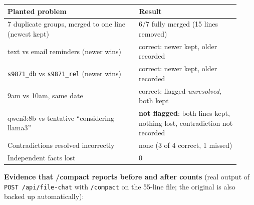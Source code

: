 \documentclass[11pt]{article}
\begin{document}
\endgroup
\begin{center}
\small\setlength{\tabcolsep}{4pt}
\begin{tabular}{p{0.52\linewidth}p{0.4\linewidth}}
\toprule
\textbf{Planted problem} & \textbf{Result} \\
\midrule
7 duplicate groups, merged to one line (newest kept) & 6/7 fully merged (15 lines removed) \\
text vs email reminders (newer wins) & correct: newer kept, older recorded \\
\texttt{s9871\_db} vs \texttt{s9871\_rel} (newer wins) & correct: newer kept, older recorded \\
9am vs 10am, same date & correct: flagged \emph{unresolved}, both kept \\
qwen3:8b vs tentative ``considering llama3'' & \textbf{not flagged}: both lines kept, nothing lost, contradiction not recorded \\
Contradictions resolved incorrectly & none (3 of 4 correct, 1 missed) \\
Independent facts lost & 0 \\
\bottomrule
\end{tabular}
\end{center}
\textbf{Evidence that /compact reports before and after counts} (real output of \verb|POST /api/file-chat| with \verb|/compact| on the 55-line file; the original is also backed up automatically):
\end{document}
